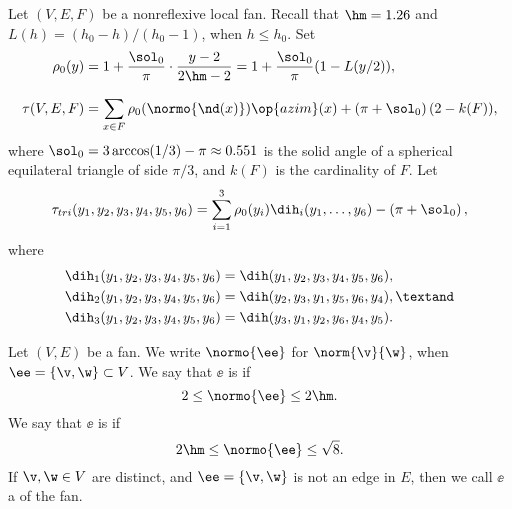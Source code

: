 \begin{definition}\label{def:tau}
Let $(V,E,F)$ be a nonreflexive local fan.  Recall that $\hm = 1.26$ and
$L(h) = ({h_0-h})/({h_0-1})$, when $h \le h_0$.
  Set
\begin{align*}
\rho_0(y) &= 1 + \dfrac{\sol_0}{\pi} \cdot
    \dfrac{y-2}{2\hm-2} = 1 + \dfrac{\sol_0}{\pi}(1 - L(y/2)),\\
  \tau(V,E,F) &=\sum_{x\in F}^{\phantom{!}} \rho_0(\normo{\nd(x)})\op{azim}(x)
+ \left(\pi+{\sol_0}\right) (2- k(F)),
\end{align*}
where $\sol_0=3\arccos(1/3)-\pi\approx0.551$ is the solid angle of a
spherical equilateral triangle of side $\pi/3$, and $k(F)$ is the
cardinality of $F$.  
Let 
\begin{equation}\label{eqn:tautri}
  \tau_{tri}(y_1,y_2,y_3,y_4,y_5,y_6) =
  \sum_{i=1}^3 \rho_0(y_i) \dih_i(y_1,\ldots,y_6)
- \left(\pi+{\sol_0}\right),
\end{equation}
where
\begin{align}\label{eqn:dihi}
\dih_1(y_1,y_2,y_3,y_4,y_5,y_6) &= \dih(y_1,y_2,y_3,y_4,y_5,y_6),\notag\\
\dih_2(y_1,y_2,y_3,y_4,y_5,y_6) &= \dih(y_2,y_3,y_1,y_5,y_6,y_4),\textand\notag \\
\dih_3(y_1,y_2,y_3,y_4,y_5,y_6) &= \dih(y_3,y_1,y_2,y_6,y_4,y_5).
\end{align}
%
%
%
%
%
%
%
\end{definition}


\begin{definition} 
Let $(V,E)$ be a fan.  
We write $\normo{\ee}$ for $\norm{\v}{\w}$, when $\ee=\{\v,\w\}\subset V$.
We say that  $\ee$ is  if
\[
2\le \normo{\ee}\le2\hm.
\]
We say that  $\ee$ is  if
\[
2\hm\le \normo{\ee}\le\sqrt{8}.
\]
If $\v,\w\in V$ are distinct, and $\ee=\{\v,\w\}$ is not an edge in $E$, then
we call $\ee$ a  of the fan.
\end{definition}


